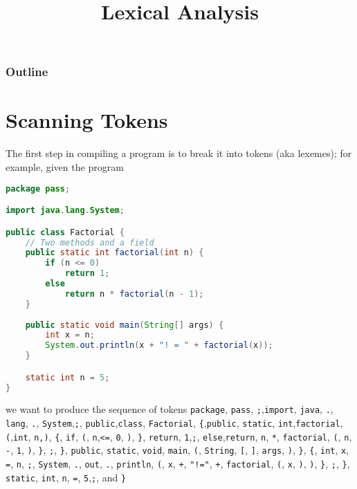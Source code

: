\documentclass[8pt,a4paper,compress]{beamer}
\title{Lexical Analysis}
\date{}
\begin{document}
\begin{frame}
\vfill
\titlepage
\end{frame}

\begin{frame}
\frametitle{Outline}
\tableofcontents
\end{frame}

\section{Scanning Tokens}
\begin{frame}[fragile]
\pause

The first step in compiling a program is to break it into tokens (aka lexemes); for example, given the \jmm program

\begin{lstlisting}[language=Java]
package pass;

import java.lang.System;

public class Factorial {
    // Two methods and a field
    public static int factorial(int n) {
        if (n <= 0)
            return 1;
        else
            return n * factorial(n - 1);
    }
    
    public static void main(String[] args) {
        int x = n;
        System.out.println(x + "! = " + factorial(x));
    }

    static int n = 5;
}
\end{lstlisting}

we want to produce the sequence of tokens \lstinline{package}, \lstinline{pass}, \lstinline{;},\lstinline{import}, \lstinline{java}, \lstinline{.}, \lstinline{lang}, \lstinline{.}, \lstinline{System},\lstinline{;}, \lstinline{public},\lstinline{class}, \lstinline{Factorial}, \lstinline${$,\lstinline{public}, \lstinline{static}, \lstinline{int},\lstinline{factorial}, \lstinline{(},\lstinline{int}, \lstinline{n,)}, \lstinline${$, \lstinline{if}, \lstinline{(}, \lstinline{n},\lstinline{<=}, \lstinline{0}, \lstinline{)}, \lstinline$}$, \lstinline{return}, \lstinline{1},\lstinline{;}, \lstinline{else},\lstinline{return}, \lstinline{n}, \lstinline{*}, \lstinline{factorial}, \lstinline{(}, \lstinline{n}, \lstinline{-}, \lstinline{1}, \lstinline{)}, \lstinline$}$, \lstinline{;}, \lstinline$}$, \lstinline{public}, \lstinline{static}, \lstinline{void}, \lstinline{main}, \lstinline{(}, \lstinline{String}, \lstinline{[}, \lstinline{]}, \lstinline{args}, \lstinline{)}, \lstinline$}$, \lstinline${$, \lstinline{int}, \lstinline{x}, \lstinline{=}, \lstinline{n}, \lstinline{;}, \lstinline{System}, \lstinline{.}, \lstinline{out}, \lstinline{.}, \lstinline{println}, \lstinline{(}, \lstinline{x}, \lstinline{+}, \lstinline{"!="}, \lstinline{+}, \lstinline{factorial}, \lstinline{(}, \lstinline{x}, \lstinline{)}, \lstinline{)}, \lstinline$}$, \lstinline{;}, \lstinline$}$, \lstinline{static}, \lstinline{int}, \lstinline{n}, \lstinline{=}, \lstinline{5},\lstinline{;}, and \lstinline$}$

\end{frame}
\end{document}
